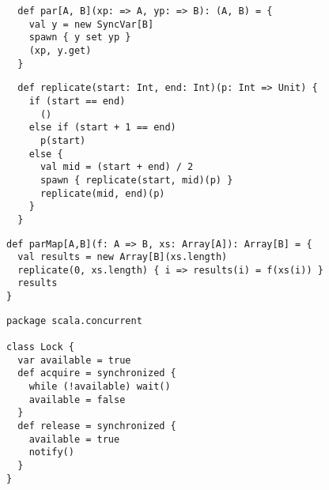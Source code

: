 

\begin{lstlisting}
  def par[A, B](xp: => A, yp: => B): (A, B) = {
    val y = new SyncVar[B]
    spawn { y set yp }
    (xp, y.get)
  }
\end{lstlisting}
\begin{lstlisting}
  def replicate(start: Int, end: Int)(p: Int => Unit) {
    if (start == end)
      ()
    else if (start + 1 == end)
      p(start)
    else {
      val mid = (start + end) / 2
      spawn { replicate(start, mid)(p) }
      replicate(mid, end)(p)
    }
  }
\end{lstlisting}


\begin{lstlisting}
def parMap[A,B](f: A => B, xs: Array[A]): Array[B] = {
  val results = new Array[B](xs.length)
  replicate(0, xs.length) { i => results(i) = f(xs(i)) }
  results
}
\end{lstlisting}



\begin{lstlisting}
package scala.concurrent

class Lock {
  var available = true
  def acquire = synchronized {
    while (!available) wait()
    available = false
  }
  def release = synchronized {
    available = true
    notify()
  }
}
\end{lstlisting}

